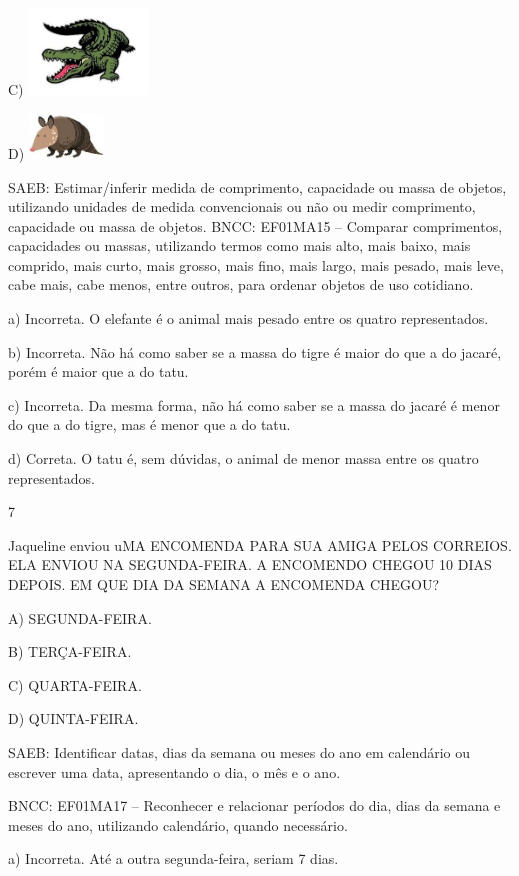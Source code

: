 \begin{itemize}
\begin{itemize}
C)
\includegraphics[width=1.25876in,height=0.90692in]{media/image149.jpg}

D)
\includegraphics[width=0.78483in,height=0.47141in]{media/image150.jpg}

SAEB: Estimar/inferir medida de comprimento, capacidade ou massa
de objetos, utilizando unidades de medida convencionais ou não ou medir
comprimento, capacidade ou massa de objetos.
BNCC: EF01MA15 -- Comparar comprimentos, capacidades ou massas,
utilizando termos como mais alto, mais baixo, mais comprido, mais curto,
mais grosso, mais fino, mais largo, mais pesado, mais leve, cabe mais,
cabe menos, entre outros, para ordenar objetos de uso cotidiano.

a) Incorreta. O elefante é o animal mais pesado entre os quatro representados.

b) Incorreta. Não há como saber se a massa do tigre é maior do que a do
jacaré, porém é maior que a do tatu.

c) Incorreta. Da mesma forma, não há como saber se a massa do jacaré é
menor do que a do tigre, mas é menor que a do tatu.

d) Correta. O tatu é, sem dúvidas, o animal de menor massa entre os
quatro representados.

\num{7}

Jaqueline enviou uMA ENCOMENDA PARA SUA AMIGA PELOS CORREIOS. ELA
ENVIOU NA SEGUNDA-FEIRA. A ENCOMENDO CHEGOU 10 DIAS DEPOIS. EM QUE DIA
DA SEMANA A ENCOMENDA CHEGOU?

A) SEGUNDA-FEIRA.

B) TERÇA-FEIRA.

C) QUARTA-FEIRA.

D) QUINTA-FEIRA.

SAEB: Identificar datas, dias da semana ou meses do ano em
calendário ou escrever uma data, apresentando o dia, o mês e o ano.

BNCC: EF01MA17 -- Reconhecer e relacionar períodos do dia, dias da semana
e meses do ano, utilizando calendário, quando necessário.

a) Incorreta. Até a outra segunda-feira, seriam 7 dias.


\end{itemize}
\end{itemize}
